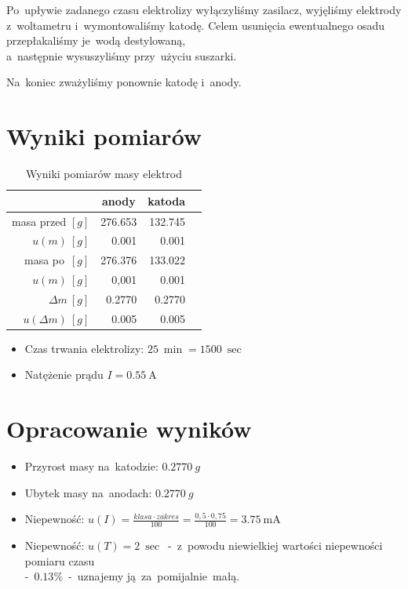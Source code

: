 \documentclass{fizraport}
\begin{document}
Po~upływie zadanego czasu elektrolizy wyłączyliśmy zasilacz, wyjęliśmy elektrody z~woltametru i~wymontowaliśmy katodę. Celem usunięcia ewentualnego osadu przepłakaliśmy je~wodą destylowaną,\\ a~następnie wysuszyliśmy przy~użyciu suszarki.

Na~koniec zważyliśmy ponownie katodę i~anody.


\section{Wyniki pomiarów}
\begin{table}[htb]
\centering
\caption{Wyniki pomiarów masy elektrod}
\begin{tabular}{|r|r|r|r|}
\hline
\multicolumn{1}{|l|}{} & \multicolumn{1}{c|}{anody} & \multicolumn{1}{c|}{katoda} \\ \hline
masa przed $[g]$       & 276.653                     & 132.745 \\ \hline
$u(m)~[g]$             & 0.001                       & 0.001  \\\hline          
masa po~$[g]$          & 276.376                     & 133.022 \\ \hline
$u(m)~[g]$             & 0,001                       & 0.001  \\ \hline
$\Delta m~[g]$         & 0.2770                      & 0.2770 \\ \hline
$u(\Delta m)~[g]$      & 0.005                       & 0.005   \\ \hline
\end{tabular}
\end{table}

\begin{itemize}
    \item  Czas trwania elektrolizy: $\SI{25}{\min}=\SI{1500}{\sec}$
    \item  Natężenie prądu $I=\SI{0.55}{\ampere}$
\end{itemize}

\newpage %
\addtocounter{page}{1}%


\section{Opracowanie wyników}
\begin{itemize}
\item Przyrost masy na~katodzie: $0.2770~g$
\item Ubytek masy na~anodach: $0.2770~g$
\item Niepewność: $u(I) = \frac{klasa  \cdot  zakres}{100} = \frac{0,5 \cdot 0,75}{100}=\SI{3,75}{\milli\ampere}$
\item Niepewność: $u(T) = \SI{2}{\sec}$~-~z~powodu niewielkiej wartości niepewności pomiaru czasu \\-~$0.13\%$~-~uznajemy ją~za~pomijalnie~małą.
\end{itemize}
\end{document}
